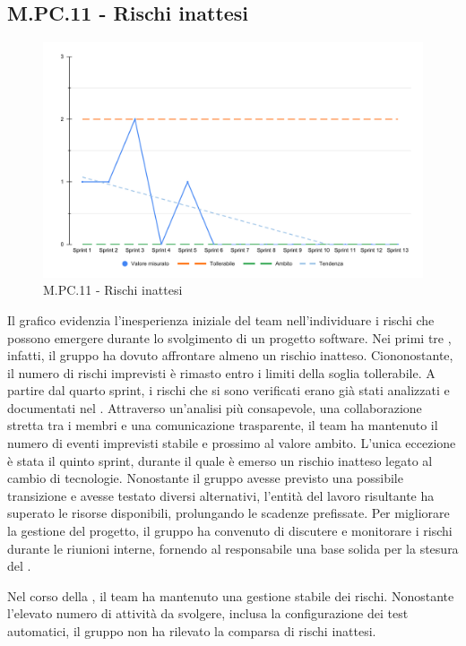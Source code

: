 \subsection{M.PC.11 - Rischi inattesi}
\begin{figure}[H]
    \centering
    \includegraphics[width=\textwidth]{assets/rischi_inattesi.pdf}
    \caption{M.PC.11 - Rischi inattesi}
\end{figure}

\par Il grafico evidenzia l’inesperienza iniziale del team nell’individuare i rischi che possono emergere durante lo svolgimento di un progetto software. Nei primi tre , infatti, il gruppo ha dovuto affrontare almeno un rischio inatteso. Ciononostante, il numero di rischi imprevisti è rimasto entro i limiti della soglia tollerabile. A partire dal quarto sprint, i rischi che si sono verificati erano già stati analizzati e documentati nel \PdP. Attraverso un’analisi più consapevole, una collaborazione stretta tra i membri e una comunicazione trasparente, il team ha mantenuto il numero di eventi imprevisti stabile e prossimo al valore ambito. L'unica eccezione è stata il quinto sprint, durante il quale è emerso un rischio inatteso legato al cambio di tecnologie. Nonostante il gruppo avesse previsto una possibile transizione e avesse testato diversi  alternativi, l’entità del lavoro risultante ha superato le risorse disponibili, prolungando le scadenze prefissate. Per migliorare la gestione del progetto, il gruppo ha convenuto di discutere e monitorare i rischi durante le riunioni interne, fornendo al responsabile una base solida per la stesura del \PdP. 

\par Nel corso della , il team ha mantenuto una gestione stabile dei rischi. Nonostante l'elevato numero di attività da svolgere, inclusa la configurazione dei test automatici, il gruppo non ha rilevato la comparsa di rischi inattesi.
